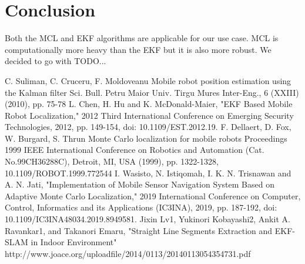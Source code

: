 \documentclass[12pt, a4paper, onecolumn]{article}
\begin{document}
\section{Conclusion}

Both the MCL and EKF algorithms are applicable for our use case.
MCL is computationally more heavy than the EKF but it is also more robust.
We decided to go with TODO...
\newpage
\begin{thebibliography}{9}

C. Suliman, C. Cruceru, F. Moldoveanu
Mobile robot position estimation using the Kalman filter
Sci. Bull. Petru Maior Univ. Tirgu Mures Inter-Eng., 6 (XXIII) (2010), pp. 75-78
L. Chen, H. Hu and K. McDonald-Maier, "EKF Based Mobile Robot Localization," 2012 Third International Conference on Emerging Security Technologies, 2012, pp. 149-154, doi: 10.1109/EST.2012.19.
F. Dellaert, D. Fox, W. Burgard, S. Thrun
Monte Carlo localization for mobile robots
Proceedings 1999 IEEE International Conference on Robotics and Automation (Cat. No.99CH36288C), Detroit, MI, USA (1999), pp. 1322-1328, 10.1109/ROBOT.1999.772544
I. Wasisto, N. Istiqomah, I. K. N. Trisnawan and A. N. Jati, "Implementation of Mobile Sensor Navigation System Based on Adaptive Monte Carlo Localization," 2019 International Conference on Computer, Control, Informatics and its Applications (IC3INA), 2019, pp. 187-192, doi: 10.1109/IC3INA48034.2019.8949581.
Jixin Lv1, Yukinori Kobayashi2, Ankit A. Ravankar1, and Takanori Emaru, "Straight Line Segments Extraction and EKF-SLAM in Indoor Environment" http://www.joace.org/uploadfile/2014/0113/20140113054354731.pdf
\end{thebibliography}
\end{document}
